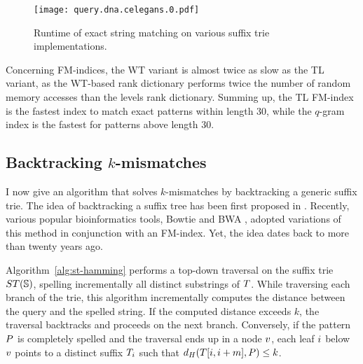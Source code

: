 \begin{figure}[b]
\begin{center}
\caption[Exact string matching runtime]{Runtime of exact string matching on various suffix trie implementations.}
\label{fig:query-dna-exact}
\texttt{[image: query.dna.celegans.0.pdf]}
\end{center}
\end{figure}


Concerning FM-indices, the WT variant is almost twice as slow as the TL variant, as the WT-based rank dictionary performs twice the number of random memory accesses than the levels rank dictionary.
Summing up, the TL FM-index is the fastest index to match exact patterns within length 30, while the $q$-gram index is the fastest for patterns above length 30.

%

\subsection{Backtracking $k$-mismatches}
\label{sec:index:algo:kmismatches}

I now give an algorithm that solves $k$-mismatches by backtracking a generic suffix trie.
The idea of backtracking a suffix tree has been first proposed in \citep{Ukkonen1993}.
Recently, various popular bioinformatics tools, \eg Bowtie \citep{Langmead2009} and BWA \citep{Li2009}, adopted variations of this method in conjunction with an FM-index.
Yet, the idea dates back to more than twenty years ago.

Algorithm~\ref{alg:st-hamming} performs a top-down traversal on the suffix trie $ST(\mathbb{S})$, spelling incrementally all distinct substrings of $T$.
While traversing each branch of the trie, this algorithm incrementally computes the distance between the query and the spelled string.
If the computed distance exceeds $k$, the traversal backtracks and proceeds on the next branch.
Conversely, if the pattern $P$ is completely spelled and the traversal ends up in a node $v$, each leaf $i$ below $v$ points to a distinct suffix $T_{i}$ such that $d_H(T[i,i+m], P) \leq k$.

